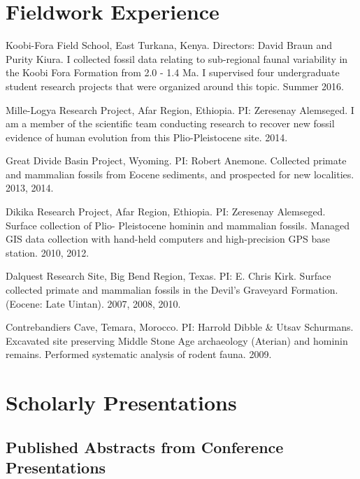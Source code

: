 \documentclass{article}
\begin{document}
\section*{Fieldwork Experience}
\begin{description*}

\item[] Koobi-Fora Field School, East Turkana, Kenya. Directors: David Braun and Purity Kiura. I collected fossil data relating to sub-regional faunal variability in the Koobi Fora Formation from 2.0 - 1.4 Ma. I supervised four undergraduate student research projects that were organized around this topic. Summer 2016. 

\item[] Mille-Logya Research Project, Afar Region, Ethiopia. PI: Zeresenay Alemseged. I am a member of the scientific team conducting research to recover new fossil evidence of human evolution from this Plio-Pleistocene site. 2014.

\item[] Great Divide Basin Project, Wyoming. PI: Robert Anemone. Collected primate and mammalian fossils from Eocene sediments, and prospected for new localities. 2013, 2014.

\item[] Dikika Research Project, Afar Region, Ethiopia. PI: Zeresenay Alemseged. Surface collection of Plio- Pleistocene hominin and mammalian fossils. Managed GIS data collection with hand-held computers and high-precision GPS base station. 2010, 2012.

\item[] Dalquest Research Site, Big Bend Region, Texas. PI: E. Chris Kirk. Surface collected primate and mammalian fossils in the Devil's Graveyard Formation. (Eocene: Late Uintan). 2007, 2008, 2010.

\item[] Contrebandiers Cave, Temara, Morocco. PI: Harrold Dibble \& Utsav Schurmans. Excavated site preserving Middle Stone Age archaeology (Aterian) and hominin remains. Performed systematic analysis of rodent fauna. 2009.
\end{description*}

\section*{Scholarly Presentations}

\subsection*{Published Abstracts from Conference Presentations}
\end{document}
